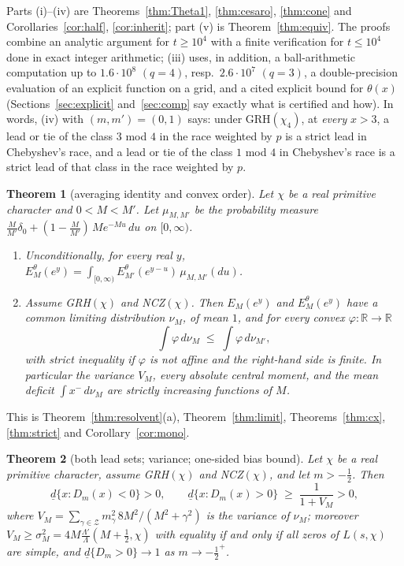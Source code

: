 \documentclass[11pt]{amsart}
\newtheorem{theorem}{Theorem}[section]
\theoremstyle{definition}
\numberwithin{equation}{section}
\newcommand{\cZ}{\mathcal Z}          %
\newcommand{\dlow}{\underline{d}}
\newcommand{\Ein}{E^{\theta}}
\begin{document}
Parts (i)--(iv) are Theorems~\ref{thm:Theta1}, \ref{thm:cesaro},
\ref{thm:cone} and Corollaries~\ref{cor:half}, \ref{cor:inherit};
part (v) is Theorem~\ref{thm:equiv}. The proofs combine an analytic
argument for $t\ge10^4$ with a finite verification for $t\le10^4$
done in exact integer arithmetic; (iii) uses, in addition, a
ball-arithmetic computation up to $1.6\cdot10^8$ $(q=4)$, resp.\
$2.6\cdot10^7$ $(q=3)$, a double-precision evaluation of an explicit
function on a grid, and a cited explicit bound for $\theta(x)$
(Sections~\ref{sec:explicit} and~\ref{sec:comp} say exactly what is
certified and how). In words, (iv) with $(m,m')=(0,1)$ says: under
GRH$(\chi_4)$, at \emph{every} $x>3$, a lead or tie of the class
$3$ mod $4$ in the race weighted by $p$ is a strict lead in
Chebyshev's race, and a lead or tie of the class $1$ mod $4$ in
Chebyshev's race is a strict lead of that class in the race weighted
by $p$.

\begin{theorem}[averaging identity and convex order]\label{thm:order}
Let $\chi$ be a real primitive character and $0<M<M'$. Let
$\mu_{M,M'}$ be the probability measure
$\frac{M}{M'}\delta_0+(1-\frac{M}{M'})\,Me^{-Mu}\,du$ on $[0,\infty)$.
\begin{enumerate}
\item[(a)] Unconditionally, for every real $y$,
$\Ein_M(e^y)=\int_{[0,\infty)}\Ein_{M'}(e^{y-u})\,\mu_{M,M'}(du)$.
\item[(b)] Assume GRH$(\chi)$ and NCZ$(\chi)$. Then $E_M(e^y)$ and
$\Ein_M(e^y)$ have a common limiting distribution $\nu_M$, of mean
$1$, and for every convex $\varphi:\mathbb R\to\mathbb R$
\[
\int\varphi\,d\nu_M\;\le\;\int\varphi\,d\nu_{M'},
\]
with strict inequality if $\varphi$ is not affine and the right-hand
side is finite. In particular the variance $V_M$, every absolute
central moment, and the mean deficit $\int x^-\,d\nu_M$ are strictly
increasing functions of $M$.
\end{enumerate}
\end{theorem}

This is Theorem~\ref{thm:resolvent}(a), Theorem~\ref{thm:limit},
Theorems~\ref{thm:cx}, \ref{thm:strict} and Corollary~\ref{cor:mono}.

\begin{theorem}[both lead sets; variance; one-sided bias bound]
\label{thm:bias}
Let $\chi$ be a real primitive character, assume GRH$(\chi)$ and
NCZ$(\chi)$, and let $m>-\tfrac12$. Then
\[
\dlow\{x:D_m(x)<0\}>0,\qquad
\dlow\{x:D_m(x)>0\}\;\ge\;\frac1{1+V_M}>0,
\]
where $V_M=\sum_{\gamma\in\cZ}m_\gamma^2\,8M^2/(M^2+\gamma^2)$ is the
variance of $\nu_M$; moreover
$V_M\ge\sigma_M^2=4M\frac{\Lambda'}{\Lambda}(M+\tfrac12,\chi)$ with
equality if and only if all zeros of $L(s,\chi)$ are simple, and
$\dlow\{D_m>0\}\to1$ as $m\to-\tfrac12^+$.
\end{theorem}
\end{document}
